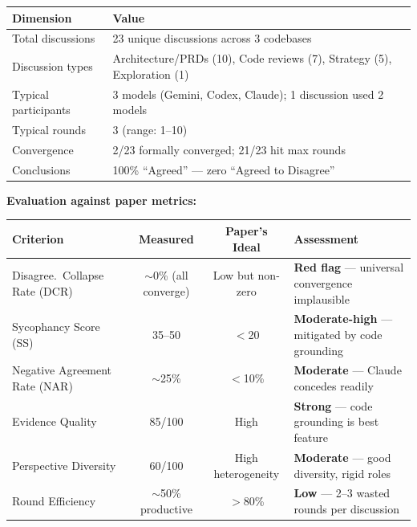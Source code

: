 \documentclass[11pt,a4paper]{article}
\begin{document}
\begin{table}[ht]
\centering
\small
\renewcommand{\arraystretch}{1.25}
\begin{tabular*}{\textwidth}{@{\extracolsep{\fill}} l l @{}}
\toprule
\textbf{Dimension} & \textbf{Value} \\
\midrule
Total discussions    & 23 unique discussions across 3 codebases \\
Discussion types     & Architecture/PRDs (10), Code reviews (7), Strategy (5), Exploration (1) \\
Typical participants & 3 models (Gemini, Codex, Claude); 1 discussion used 2 models \\
Typical rounds       & 3 (range: 1--10) \\
Convergence          & 2/23 formally converged; 21/23 hit max rounds \\
Conclusions          & 100\% ``Agreed'' --- zero ``Agreed to Disagree'' \\
\bottomrule
\end{tabular*}
\end{table}

\noindent\textbf{Evaluation against paper metrics:}

\begin{table}[ht]
\centering
\footnotesize
\renewcommand{\arraystretch}{1.3}
\begin{tabular*}{\textwidth}{@{\extracolsep{\fill}} l c c l @{}}
\toprule
\textbf{Criterion} & \textbf{Measured} & \textbf{Paper's Ideal} & \textbf{Assessment} \\
\midrule
Disagree.\ Collapse Rate (DCR) & $\sim$0\% (all converge) & Low but non-zero & \textbf{Red flag} --- universal convergence implausible \\
Sycophancy Score (SS)           & 35--50                   & ${<}$20           & \textbf{Moderate-high} --- mitigated by code grounding \\
Negative Agreement Rate (NAR)   & $\sim$25\%               & ${<}$10\%         & \textbf{Moderate} --- Claude concedes readily \\
Evidence Quality                & 85/100                   & High              & \textbf{Strong} --- code grounding is best feature \\
Perspective Diversity           & 60/100                   & High heterogeneity & \textbf{Moderate} --- good diversity, rigid roles \\
Round Efficiency                & $\sim$50\% productive    & ${>}$80\%         & \textbf{Low} --- 2--3 wasted rounds per discussion \\
\bottomrule
\end{tabular*}
\end{table}
\end{document}
